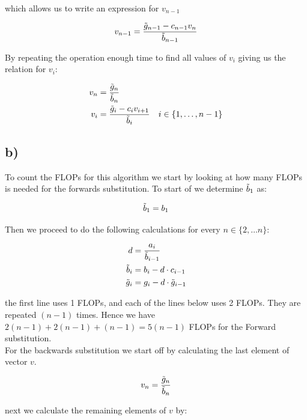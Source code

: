 \documentclass[a4paper,10pt,english]{article}
\begin{document}
which allows us to write an expression for $v_{n-1}$

\begin{equation*}
        v_{n-1} = \frac{\Tilde{g}_{n-1}-c_{n-1}v_n}{\Tilde{b}_{n-1}}
\end{equation*}

By repeating the operation enough time to find all values of $v_i$ giving us the
relation for $v_i$:

\begin{align*}
    v_n &= \frac{\Tilde{g}_n}{\Tilde{b}_n} \\
    v_i &= \frac{\Tilde{g}_i - c_i v_{i+1}}{\Tilde{b}_i} \quad i \in \{1, \dots, n-1\} 
\end{align*}


\subsection{b)}
To count the FLOPs for this algorithm we start by looking at how many FLOPs is
needed for the forwards substitution.
To start of we determine $\Tilde{b}_1$ as:

\begin{equation}
  \Tilde{b}_1 = b_1
  \label{eq_gen_algo_I}
\end{equation}

Then we proceed to do the following calculations for every $n \in \{2,\dots n\}$:

\begin{align}
	d &= \frac{a_i}{\Tilde{b}_{i-1}} \\
  \Tilde{b}_i &= b_i - d \cdot c_{i-1}
  \label{eq_gen_algo_II} \\
  \Tilde{g}_i &= g_i - d \cdot \Tilde{g}_{i-1}
  \label{eq_gen_algo_III}
\end{align}

the first line uses 1 FLOPs, and each of the lines below uses 2 FLOPs. They are repeated 
$(n-1)$ times.  Hence we have $2(n-1) + 2(n-1) + (n - 1) = 5(n-1)$ FLOPs for the Forward substitution.
 \\

For the backwards substitution we start off by calculating the last element of vector $v$.

\begin{equation}
  v_n = \frac{\Tilde{g}_n}{\Tilde{b}_n}
  \label{eq_gen_algo_IV}
\end{equation}

next we calculate the remaining elements of $v$ by:
\end{document}
